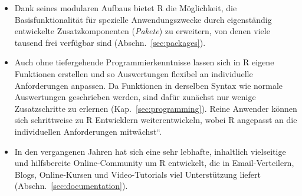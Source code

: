 \begin{itemize}
\item Dank seines modularen Aufbaus bietet R die Möglichkeit, die Basisfunktionalität für spezielle Anwendungszwecke durch eigenständig entwickelte Zusatzkomponenten (\emph{Pakete}) zu erweitern, von denen viele tausend frei verfügbar sind (Abschn.\ \ref{sec:packages}).
\item Auch ohne tiefergehende Programmierkenntnisse lassen sich in R eigene Funktionen erstellen und so Auswertungen flexibel an individuelle Anforderungen anpassen. Da Funktionen in derselben Syntax wie normale Auswertungen geschrieben werden, sind dafür zunächst nur wenige Zusatzschritte zu erlernen (Kap.\ \ref{sec:programming}). Reine Anwender können sich schrittweise zu R Entwicklern weiterentwickeln, wobei R angepasst an die individuellen Anforderungen {\quotedblbase}mitwächst{\textquotedblleft}.
\item In den vergangenen Jahren hat sich eine sehr lebhafte, inhaltlich vielseitige und hilfsbereite Online-Community um R entwickelt, die in Email-Verteilern, Blogs, Online-Kursen und Video-Tutorials viel Unterstützung liefert (Abschn.\ \ref{sec:documentation}).
\end{itemize}

